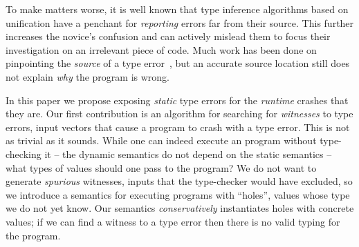 To make matters worse, it is well known that type inference algorithms
based on unification have a penchant for \emph{reporting} errors far
from their source.
%
This further increases the novice's confusion and can actively mislead
them to focus their investigation on an irrelevant piece of code.
%
Much work has been done on pinpointing the \emph{source} of a type
error~\cite{lerner_searching_2007,chen_counter-factual_2014,zhang_toward_2014,pavlinovic_finding_2014},
but an accurate source location still does not explain \emph{why} the
program is wrong.

In this paper we propose exposing \emph{static} type errors for the
\emph{runtime} crashes that they are.
%
Our first contribution is an algorithm for searching for
\emph{witnesses} to type errors, \ie input vectors that cause a program
to crash with a type error.
%
This is not as trivial as it sounds.
%
While one can indeed execute an \ocaml program without type-checking it
-- the dynamic semantics do not depend on the static semantics -- what
types of values should one pass to the program?
%
We do not want to generate \emph{spurious} witnesses, inputs that the
type-checker would have excluded, so we introduce a semantics for
executing \ocaml programs with ``holes'', values whose type we do not
yet know.
%
%
Our semantics \emph{conservatively} instantiates holes with concrete
values; if we can find a witness to a type error then there is no valid
typing for the program.

